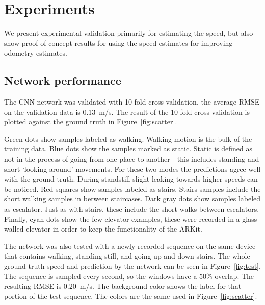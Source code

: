 \documentclass{article}
\begin{document}
\section{Experiments}
\label{sec:experiments}

We present experimental validation primarily for estimating the speed, but also show proof-of-concept results for using the speed estimates for improving odometry estimates.

\subsection{Network performance}
The CNN network was validated with 10-fold cross-validation, the average RMSE on the validation data is 0.13~m/s. The result of the 10-fold cross-validation is plotted against the ground truth in Figure~\ref{fig:scatter}.

Green dots show samples labeled as walking. Walking motion is the bulk of the training data. Blue dots show the samples marked as static. Static is defined as not in the process of going from one place to another---this includes standing and short `looking around' movements. For these two modes the predictions agree well with the ground truth. During standstill slight leaking towards higher speeds can be noticed. Red squares show samples labeled as stairs. Stairs samples include the short walking samples in between staircases. Dark gray dots show samples labeled as escalator. Just as with stairs, these include the short walks between escalators. Finally, cyan dots show the few elevator examples, these were recorded in a glass-walled elevator in order to keep the functionality of the ARKit.

The network was also tested with a newly recorded sequence on the same device that contains walking, standing still, and going up and down stairs. The whole ground truth speed and prediction by the network can be seen in Figure~\ref{fig:test}. The sequence is sampled every second, so the windows have a 50\% overlap. The resulting  RMSE  is 0.20~m/s. The background color shows the label for that portion of the test sequence. The colors are the same used in Figure~\ref{fig:scatter}.
\end{document}
